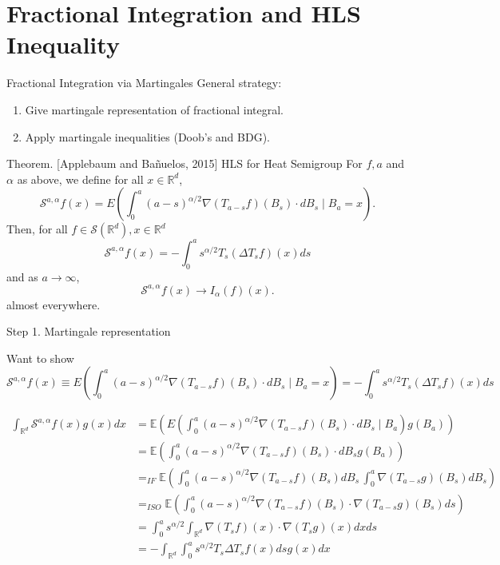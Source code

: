 \documentclass{if-beamer}
\begin{document}
\section{Fractional Integration and HLS Inequality}
\begin{frame}{Fractional Integration via Martingales}
    General strategy:
    \begin{enumerate}
        \item Give martingale representation of fractional integral.
        \item Apply martingale inequalities (Doob's and BDG).
    \end{enumerate} 
    \begin{block}{Theorem. [Applebaum and Ba\~nuelos, 2015] HLS for Heat Semigroup}
        For $f, a$ and $\alpha$ as above, we define for all $x \in \mathbb{R}^d$,
        \[
        \mathcal{S}^{a, \alpha} f(x)={E}\left(\int_0^a(a-s)^{\alpha / 2} \nabla\left(T_{a-s} f\right)\left(B_s\right) \cdot d B_s \mid B_a=x\right) .
        \]
        Then, for all $f \in \mathcal{S}\left(\mathbb{R}^d\right), x \in \mathbb{R}^d$
        \[
        \mathcal{S}^{a, \alpha} f(x)=-\int_0^a s^{\alpha / 2} T_s\left(\Delta T_s f\right)(x) d s
        \]
        and as $a \rightarrow \infty$,
        \[
        \mathcal{S}^{a, \alpha} f(x) \rightarrow I_\alpha(f)(x) .
        \]
        almost everywhere.
    \end{block}
\end{frame}

\begin{frame}{Step 1. Martingale representation}
    \begin{block}{Want to show}
       \[
        \mathcal{S}^{a, \alpha} f(x)
        \equiv E\left(\int_0^a(a-s)^{\alpha / 2} \nabla\left(T_{a-s} f\right)\left(B_s\right) \cdot d B_s \mid B_a=x\right)
        =-\int_0^a s^{\alpha / 2} T_s\left(\Delta T_s f\right)(x) d s
        \] 
    \end{block}
    \begin{align*}
        \int_{\mathbb{R}^d} \mathcal{S}^{a, \alpha} f(x) g(x) d x 
        &= \mathbb{E}\left( E\left(\int_0^a(a-s)^{\alpha / 2} \nabla\left(T_{a-s} f\right)\left(B_s\right) \cdot d B_s \mid B_a\right) g(B_a)\right) \\
        &= \mathbb{E}\left(\int_0^a(a-s)^{\alpha / 2} \nabla\left(T_{a-s} f\right)\left(B_s\right) \cdot d B_s g(B_a)\right) \\
        &=_{IF} \mathbb{E}\left(\int_0^a(a-s)^{\alpha / 2} \nabla\left(T_{a-s} f\right)\left(B_s\right)d B_s \, \int_0^a\nabla\left(T_{a-s} g\right)\left(B_s\right)d B_s\right)\\
        &=_{ISO} \mathbb{E}\left(\int_0^a(a-s)^{\alpha / 2} \nabla\left(T_{a-s} f\right)\left(B_s\right) \cdot \nabla\left(T_{a-s} g\right)\left(B_s\right) d s\right)\\
        &= \int_0^a s^{\alpha / 2}\int_{\mathbb{R}^d} \nabla\left(T_s f\right)(x) \cdot \nabla\left(T_s g\right)(x) d x d s \\
        &= - \int_{\mathbb{R}^d} \int_0^a s^{\alpha / 2} T_s \Delta T_{s} f(x) ds g(x) d x
    \end{align*}
\end{frame}
\end{document}
